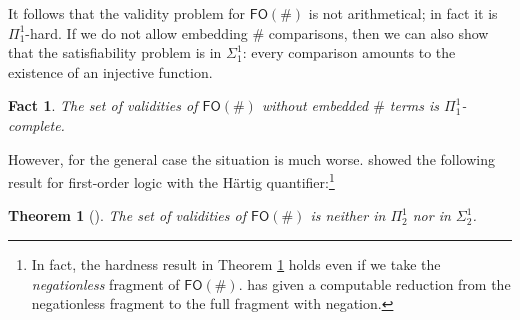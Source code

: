 \documentclass[12pt,oneside,reqno]{amsart}
\newtheorem{fact}{Fact}
\newtheorem{proposition}{Proposition}
\newtheorem{theorem}{Theorem}
\theoremstyle{definition}
\begin{document}
It follows that the validity problem for $\mathsf{FO}(\#)$ is not arithmetical; in fact it is $\Pi^1_1$-hard. If we do not allow embedding $\#$ comparisons, then we can also show that the satisfiability problem is in $\Sigma^1_1$: every comparison amounts to the existence of an injective function.
\begin{fact} The set of validities of $\mathsf{FO}(\#)$ without embedded $\#$ terms is $\Pi^1_1$-complete.
\end{fact}

However, for the general case the situation is much worse. \cite{hartig} showed the following result for first-order logic with the H\"{a}rtig quantifier:\footnote{In fact, the hardness result in Theorem \ref{pi12} holds even if we take the \emph{negationless} fragment of $\mathsf{FO}(\#)$. \cite{Mayer} has given a computable reduction from the negationless fragment to the full fragment with negation.} %
\begin{theorem}[\citealt{hartig}] The set of validities of $\mathsf{FO}(\#)$ is neither in $\Pi^1_2$ nor in $\Sigma^1_2$. \label{pi12}
\end{theorem}
\end{document}
